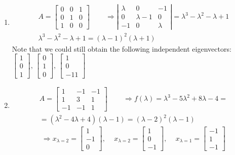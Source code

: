 \documentclass[twoside]{amsart}
\theoremstyle{plain}
\theoremstyle{definition}
\newcommand{\exercisehead}[1]
  {
   \noindent{\small\bf Exercise #1.}
   \smallskip}
\begin{document}
\exercisehead{4} 
\begin{enumerate}
\item \[
  \begin{gathered}
    A = \left[ \begin{matrix} 0 & 0 & 1 \\ 0 & 1 & 0 \\ 1 & 0 & 0 \end{matrix} \right] \quad \quad \, \Longrightarrow \left| \begin{matrix} \lambda & 0 & -1 \\ 0 & \lambda - 1 & 0 \\ -1 & 0 & \lambda \end{matrix} \right| = \lambda^3 - \lambda^2 - \lambda +1 \\
    \lambda^3 - \lambda^2 - \lambda +1 = (\lambda-1)^2 (\lambda +1)
\end{gathered}
\]
Note that we could still obtain the following independent eigenvectors: $ \left[ \begin{matrix} 1 \\ 0 \\ 1 \end{matrix} \right], \,  \left[ \begin{matrix} 0 \\ 1 \\ 0 \end{matrix} \right], \,  \left[ \begin{matrix} 1 \\ 0 \\ -11 \end{matrix} \right]$ 
\item \[
\begin{gathered}
  A = \left[ \begin{matrix} 1 & -1 & -1 \\ 1 & 3 & 1 \\ -1 & -1 & 1 \end{matrix} \right] \quad \quad \, \Longrightarrow f(\lambda) = \lambda^3 - 5 \lambda^2 + 8 \lambda -4 = \\
  = (\lambda^2 - 4 \lambda +4)(\lambda -1) = (\lambda -2)^2 (\lambda-1) 
\end{gathered}
\]
\[
\Longrightarrow x_{\lambda =2} = \left[ \begin{matrix} 1 \\ -1 \\ 0 \end{matrix} \right], \quad \, x_{\lambda =2} = \left[ \begin{matrix} 1 \\ 0 \\ -1 \end{matrix} \right], \quad \, x_{\lambda =1} = \left[ \begin{matrix} -1 \\ 1 \\ -1 \end{matrix} \right]
\]
\end{enumerate}
\end{document}
